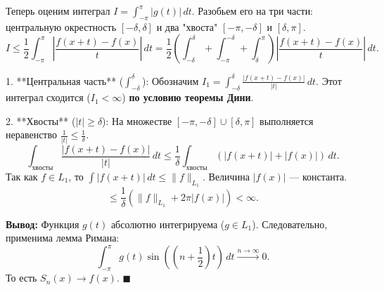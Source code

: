 \documentclass[12pt,a4paper,openany]{book}
\begin{document}
Теперь оценим интеграл $I = \int_{-\pi}^{\pi} |g(t)| \, dt$. Разобьем его на три части: центральную окрестность $[-\delta, \delta]$ и два "хвоста" $[-\pi, -\delta]$ и $[\delta, \pi]$.
$$ I \le \frac{1}{2} \int_{-\pi}^{\pi} \left| \frac{f(x+t) - f(x)}{t} \right| \, dt = \frac{1}{2} \left( \int_{-\delta}^{\delta} + \int_{-\pi}^{-\delta} + \int_{\delta}^{\pi} \right) \left| \frac{f(x+t) - f(x)}{t} \right| \, dt. $$

1.  **Центральная часть** ($\int_{-\delta}^{\delta}$):
    Обозначим $I_1 = \int_{-\delta}^{\delta} \frac{|f(x+t) - f(x)|}{|t|} \, dt$. Этот интеграл сходится ($I_1 < \infty$) \textbf{по условию теоремы Дини}.

2.  **Хвосты** ($|t| \ge \delta$):
    На множестве $[-\pi, -\delta] \cup [\delta, \pi]$ выполняется неравенство $\frac{1}{|t|} \le \frac{1}{\delta}$.
    $$ \int_{\text{хвосты}} \frac{|f(x+t) - f(x)|}{|t|} \, dt \le \frac{1}{\delta} \int_{\text{хвосты}} (|f(x+t)| + |f(x)|) \, dt. $$
    Так как $f \in L_1$, то $\int |f(x+t)| \, dt \le \|f\|_{L_1}$. Величина $|f(x)|$ — константа.
    $$ \le \frac{1}{\delta} \left( \|f\|_{L_1} + 2\pi |f(x)| \right) < \infty. $$

\textbf{Вывод:} Функция $g(t)$ абсолютно интегрируема ($g \in L_1$). Следовательно, применима лемма Римана:
$$ \int_{-\pi}^{\pi} g(t) \sin\left(\left(n + \frac{1}{2}\right)t\right) \, dt \xrightarrow{n \to \infty} 0. $$
То есть $S_n(x) \to f(x)$. $\blacksquare$

\begin{center}
\end{center}
\end{document}
